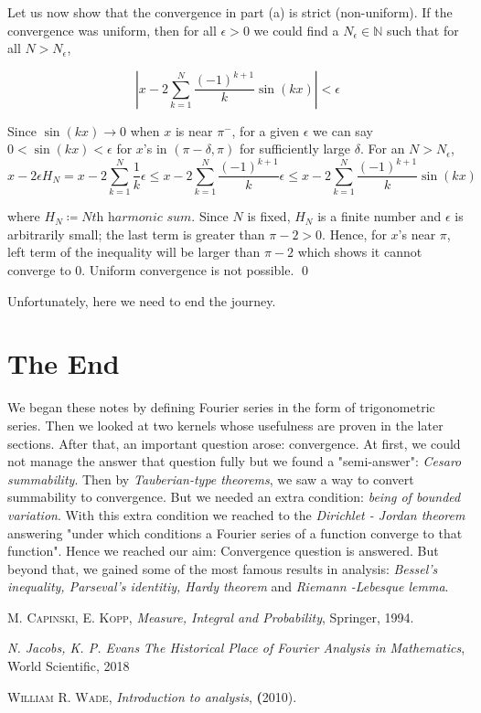 \documentclass[12pt]{amsart}
\theoremstyle{definition}
\newcommand{\NN}{{\mathbb N}} %
\begin{document}
Let us now show that the convergence in part (a) is strict (non-uniform). If the convergence was uniform, then for all $\epsilon > 0$ we could find a $N_\epsilon \in \NN$ such that for all $N > N_\epsilon$,


\begin{equation}\label{not uniform}
    \left|x - 2\sum_{k=1}^{N}\frac{(-1)^{k+1}}{k}\sin(kx)\right| < \epsilon
\end{equation}



Since $\sin(kx) \to 0$ when $x$ is near $\pi^-$, for a given $\epsilon$ we can say $0 < \sin(kx) < \epsilon$ for $x$'s in $(\pi-\delta, \pi)$ for sufficiently large $\delta$. For an $N > N_\epsilon$,
\[
x - 2 \epsilon H_N = x - 2\sum_{k=1}^{N}\frac{1}{k}\epsilon \leq x - 2\sum_{k=1}^{N}\frac{(-1)^{k+1}}{k}\epsilon \leq x - 2\sum_{k=1}^{N}\frac{(-1)^{k+1}}{k}\sin(kx) 
\]


where $H_N \coloneqq N\textit{th harmonic sum}$. Since $N$ is fixed, $H_N$ is a finite number and $\epsilon$ is arbitrarily small; the last term is greater than $\pi - 2 > 0$. Hence, for $x$'s near $\pi$, left term of the inequality will be larger than $\pi - 2$ which shows it cannot converge to 0. Uniform convergence is not possible. \qed


Unfortunately, here we need to end the journey.


\section{The End}


We began these notes by defining Fourier series in the form of trigonometric series. Then we looked at two kernels whose usefulness are proven in the later sections. After that, an important question arose: convergence. At first, we could not manage the answer that question fully but we found a "semi-answer": \emph{Cesaro summability}. Then by \emph{Tauberian-type theorems}, we saw a way to convert summability to convergence. But we needed an extra condition: \emph{being of bounded variation}. With this extra condition we reached to the \emph{Dirichlet - Jordan theorem} answering "under which conditions a Fourier series of a function converge to that function". Hence we reached our aim: Convergence question is answered. But beyond that, we gained some of the most famous results in analysis: \emph{Bessel's inequality, Parseval's identitiy, Hardy theorem} and \emph{Riemann -Lebesque lemma}.


\begin{thebibliography}{99}

 \textsc{M. Capinski, E. Kopp}, \textit{Measure, Integral and Probability}, Springer,
 1994.

  \textit{N. Jacobs, K. P. Evans} \textit{The Historical Place of Fourier Analysis in Mathematics}, World Scientific, 2018

  \textsc{William R. Wade},  \textit{Introduction to analysis}, \textbf(2010).

\end{thebibliography}
\end{document}
